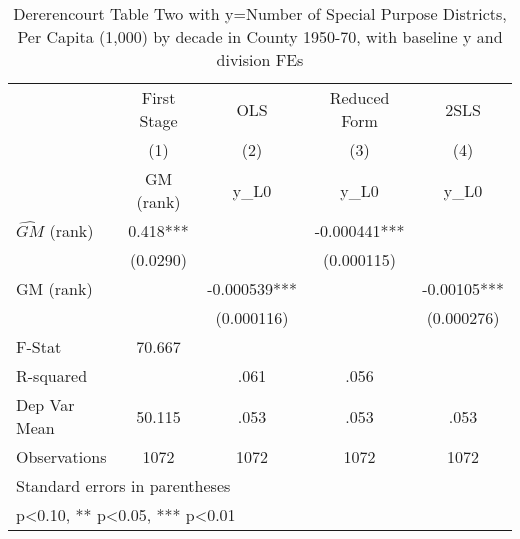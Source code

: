 \begin{table}[htbp]\centering
\def\sym#1{\ifmmode^{#1}\else\(^{#1}\)\fi}
\caption{Dererencourt Table Two with y=Number of Special Purpose Districts, Per Capita (1,000) by decade in County 1950-70, with baseline y and division FEs}
\begin{tabular}{l*{4}{c}}
\toprule
                    & First Stage   &         OLS   &Reduced Form   &        2SLS   \\
                    &\multicolumn{1}{c}{(1)}&\multicolumn{1}{c}{(2)}&\multicolumn{1}{c}{(3)}&\multicolumn{1}{c}{(4)}\\
                    &\multicolumn{1}{c}{GM  (rank)}&\multicolumn{1}{c}{y\_L0}&\multicolumn{1}{c}{y\_L0}&\multicolumn{1}{c}{y\_L0}\\
\midrule
$\hat{GM}$ (rank)   &       0.418***&               &   -0.000441***&               \\
                    &    (0.0290)   &               &  (0.000115)   &               \\
\addlinespace
GM  (rank)          &               &   -0.000539***&               &    -0.00105***\\
                    &               &  (0.000116)   &               &  (0.000276)   \\
\midrule
F-Stat              &      70.667   &               &               &               \\
R-squared           &               &        .061   &        .056   &               \\
Dep Var Mean        &      50.115   &        .053   &        .053   &        .053   \\
Observations        &        1072   &        1072   &        1072   &        1072   \\
\bottomrule
\multicolumn{5}{l}{\footnotesize Standard errors in parentheses}\\
\multicolumn{5}{l}{\footnotesize * p<0.10, ** p<0.05, *** p<0.01}\\
\end{tabular}
\end{table}
